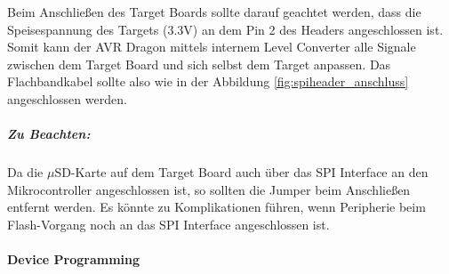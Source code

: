 Beim Anschließen des Target Boards sollte darauf geachtet werden, dass die Speisespannung des Targets (3.3V) an dem Pin 2 des Headers angeschlossen ist. Somit kann der AVR Dragon mittels internem Level Converter alle Signale zwischen dem Target Board und sich selbst dem Target anpassen. Das Flachbandkabel sollte also wie in der Abbildung \ref{fig:spiheader_anschluss} angeschlossen werden.

\subparagraph{Zu Beachten:}
Da die $\mu$SD-Karte auf dem Target Board auch über das SPI Interface an den Mikrocontroller angeschlossen ist, so sollten die Jumper beim Anschließen entfernt werden. Es könnte zu Komplikationen führen, wenn Peripherie beim Flash-Vorgang noch an das SPI Interface angeschlossen ist.\\

\paragraph{Device Programming}
\label{para:device_programming}